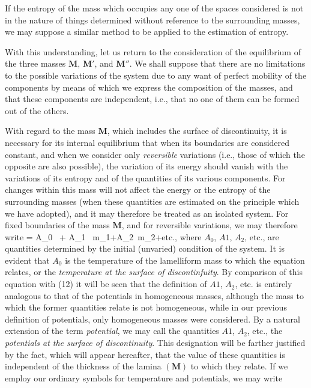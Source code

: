 \documentclass[12pt]{memoir}
\begin{document}
{If the entropy of the mass which occupies any one of the spaces considered is not in the nature of things determined without reference to the surrounding masses, we may suppose a similar method to be applied to the estimation of entropy.


With this understanding, let us return to the consideration of the equilibrium of the three masses $\mathbf{M}$, $\mathbf{M}'$, and $\mathbf{M}''$. We shall suppose that there are no limitations to the possible variations of the system due to any want of perfect mobility of the components by means of which we express the composition of the masses, and that these components are independent, i.e., that no one of them can be formed out of the others.


With regard to the mass $\mathbf{M}$, which includes the surface of discontinuity, it is necessary for its internal equilibrium that when its boundaries are considered constant, and when we consider only \textit{reversible} variations (i.e., those of which the opposite are also possible), the variation of its energy should vanish with the variations of its entropy and of the quantities of its various components. For changes within this mass will not affect the energy or the entropy of the surrounding masses (when these quantities are estimated on the principle which we have adopted), and it may therefore be treated as an isolated system. For fixed boundaries of the mass $\mathbf{M}$, and for reversible variations, we may therefore write
\eqs  \delta \epsilon= A_0 \, \delta \eta + A_1 \, \delta m_1+A_2\, \delta m_2+etc., \label{476} \eqe
where $A_0$, $A1$, $A_2$, etc., are quantities determined by the initial (unvaried) condition of the system. It is evident that $A_0$ is the temperature of the lamelliform mass to which the equation relates, or the \textit{temperature at the surface of discontinfuity}. By comparison of this equation with (12) it will be seen that the definition of $A1$, $A_2$, etc. is entirely analogous to that of the potentials in homogeneous masses, although the mass to which the former quantities relate is not homogeneous, while in our previous definition of potentials, only homogeneous masses were considered. By a natural extension of the term \textit{potential}, we may call the quantities $A1$, $A_2$, etc., the \textit{potentials at the surface of discontinuity}. This designation will be farther justified by the fact, which will appear hereafter, that the value of these quantities is independent of the thickness of the lamina $(\mathbf{M})$ to which they relate. If we employ our ordinary symbols for temperature and potentials, we may write
}
\end{document}
